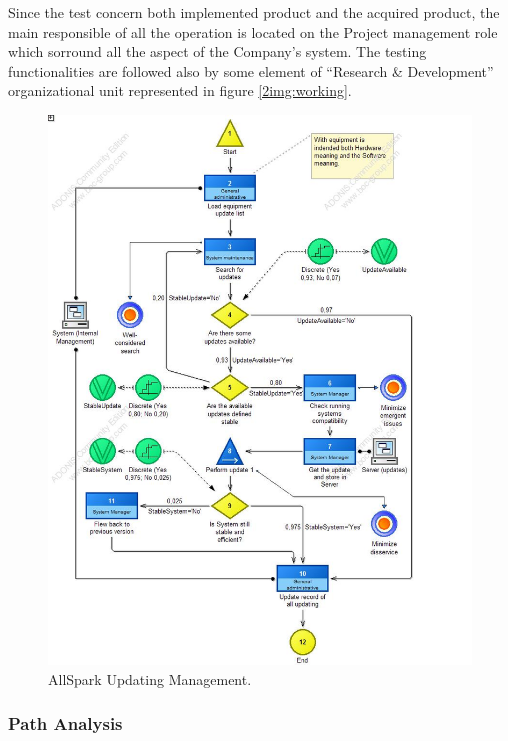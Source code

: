 Since the test concern both implemented product and the acquired product, the main responsible of all the operation is located on the Project management role which sorround all the aspect of the Company's system. The testing functionalities are followed also by some element of ``Research & Development'' organizational unit represented in figure \ref{2img:working}.

\begin{figure}[ht!]
\begin{centering}
\includegraphics[scale=0.50]{assign2/adonis/imgs/updating.jpg}
\caption{AllSpark Updating Management.}
\label{2img:updating}
\end{centering}
\end{figure}


\subsubsection{Path Analysis}


\begin{alltt}

\end{alltt}


